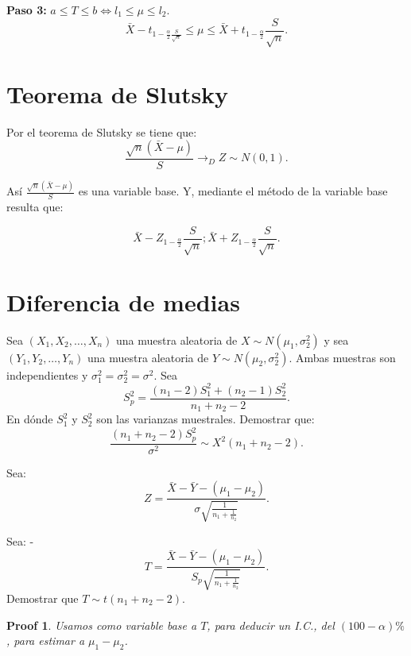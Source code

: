 \documentclass{article}
\newtheorem{myprf}{Proof}
\begin{document}
\textbf{Paso 3:} $a \leq T \leq b \iff l_{1} \leq \mu \leq l_{2}$.
\[ \bar{X}-t_{1-\frac{\alpha}{2} \frac{S}{\sqrt{n}}} \leq \mu \leq \bar{X}+t_{1-\frac{\alpha}{2}}\frac{S}{\sqrt{n}}.\]

\section{Teorema de Slutsky}

Por el teorema de Slutsky se tiene que:
\[ \frac{\sqrt{n}{(\bar{X}-\mu)}}{S} \rightarrow_{D} Z\sim N{(0,1)}.\]

Así $\frac{\sqrt{n}{(\bar{X}-\mu)}}{S}$ es una variable base. Y, mediante el método de la variable base resulta que:

\[\bar{X}-Z_{1-\frac{\alpha}{2}} \frac{S}{\sqrt{n}};\bar{X}+Z_{1-\frac{\alpha}{2}} \frac{S}{\sqrt{n}}.\]

\section{Diferencia de medias}

Sea $(X_{1},X_{2},\ldots,X_{n})$ una muestra aleatoria de $X\sim N{(\mu_{1},\sigma^{2}_{2})}$ y sea $(Y_{1},Y_{2},\ldots,Y_{n})$ una muestra aleatoria de $Y\sim N{(\mu_{2},\sigma^{2}_{2})}$. Ambas muestras son independientes y $\sigma^{2}_{1}=\sigma^{2}_{2}=\sigma^{2}$. Sea
\[ S^{2}_{p}=\frac{{(n_{1}-2)}S^{2}_{1}+{(n_{2}-1)}S^{2}_{2}}{n_{1}+n_{2}-2}.\]
En dónde $S^{2}_{1}$ y $S^{2}_{2}$ son las varianzas muestrales. Demostrar que:
\[ \frac{{(n_{1}+n_{2}-2)}S^{2}_{p}}{\sigma^{2}} \sim X^{2}{(n_{1}+n_{2}-2)}.\]

Sea:
\[ Z = \frac{\bar{X}-\bar{Y}-{(\mu_{1}-\mu_{2})}}{\sigma \sqrt{\frac{1}{n_{1}+\frac{1}{n_{2}}}}}.\]

Sea:
-\[ T = \frac{\bar{X}-\bar{Y}-{(\mu_{1}-\mu_{2})}}{S_{p}\sqrt{\frac{1}{n_{1}+\frac{1}{n_{2}}}}}.\]
Demostrar que $T\sim t{(n_{1}+n_{2}-2)}$.

\begin{myprf}
	Usamos como variable base a $T$, para deducir un I.C., del ${(100-\alpha)}\%$, para estimar a $\mu_{1}-\mu_{2}$.


\end{myprf}
 
\end{document}
